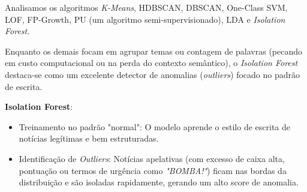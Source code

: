 \documentclass[
  brazilian,
  11pt,
]{article}
\providecommand{\tightlist}{%
  \setlength{\itemsep}{0pt}\setlength{\parskip}{0pt}}
\begin{document}
Analisamos os algoritmos \emph{K-Means}, HDBSCAN, DBSCAN, One-Class SVM, LOF, FP-Growth, PU (um algoritmo semi-supervisionado), LDA e \emph{Isolation Forest.}

Enquanto os demais focam em agrupar temas ou contagem de palavras (pecando em custo computacional ou na perda do contexto semântico), o \emph{Isolation Forest} destaca-se como um excelente detector de anomalias (\emph{outliers}) focado no padrão de escrita.

\textbf{Isolation Forest}:

\begin{itemize}
\tightlist
\item
  Treinamento no padrão "normal": O modelo aprende o estilo de escrita de notícias legítimas e bem estruturadas.
\item
  Identificação de \emph{Outliers}: Notícias apelativas (com excesso de caixa alta, pontuação ou termos de urgência como \emph{"BOMBA!"}) ficam nas bordas da distribuição e são isoladas rapidamente, gerando um alto score de anomalia.
\end{itemize}
\end{document}
